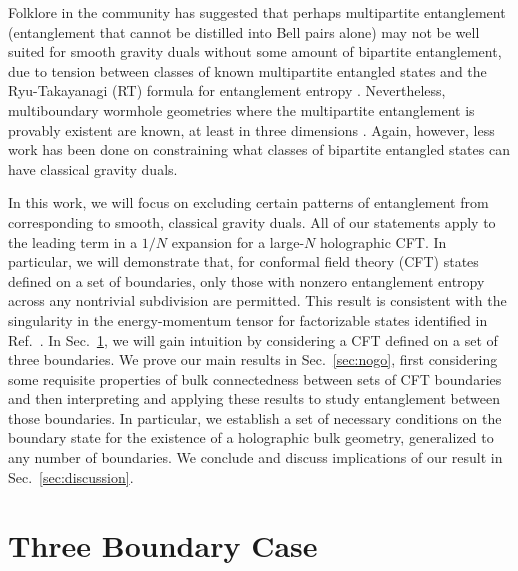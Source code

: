 \documentclass[12pt,english]{article}
\newcommand{\Ref}[1]{Ref.~\cite{#1}}
\newcommand{\Sec}[1]{Sec.~\ref{#1}}
\begin{document}
Folklore in the community has suggested that perhaps multipartite entanglement (entanglement that cannot be distilled into Bell pairs alone) may not be well suited for smooth gravity duals without some amount of bipartite entanglement, due to tension between classes of known multipartite entangled states and the Ryu-Takayanagi (RT) formula for entanglement entropy \cite{Ryu:2006bv, Hayden:2011ag, Bao:2015bfa}. Nevertheless, multiboundary wormhole geometries where the multipartite entanglement is provably existent are known, at least in three dimensions \cite{Balasubramanian:2014hda}. Again, however, less work has been done on constraining what classes of bipartite entangled states can have classical gravity duals.

In this work, we will focus on excluding certain patterns of entanglement from corresponding to smooth, classical gravity duals. All of our statements apply to the leading term in a $1/N$ expansion for a large-$N$ holographic CFT. In particular, we will demonstrate that, for conformal field theory (CFT) states defined on a set of boundaries, only those with nonzero entanglement entropy across any nontrivial subdivision are permitted. This result is consistent with the singularity in the energy-momentum tensor for factorizable states identified in \Ref{Czech:2012be}. In \Sec{sec:threeboundary}, we will gain intuition by considering a CFT defined on a set of three boundaries. We prove our main results in \Sec{sec:nogo}, first considering some requisite properties of bulk connectedness between sets of CFT boundaries and then interpreting and applying these results to study entanglement between those boundaries. In particular, we establish a set of necessary conditions on the boundary state for the existence of a holographic bulk geometry, generalized to any number of boundaries. We conclude and discuss implications of our result in \Sec{sec:discussion}.

\section{Three Boundary Case}\label{sec:threeboundary}
\end{document}
